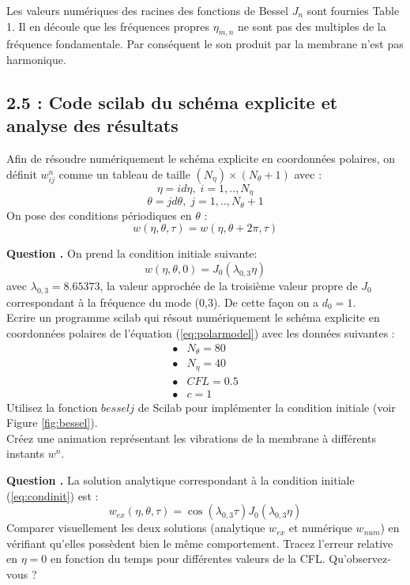 \documentclass[a4,12pt]{article}
\newcounter{Nbquestion}
\newcommand*\question{%
\stepcounter{Nbquestion}%
\textbf{Question \theNbquestion. }}
\begin{document}
    Les valeurs numériques des racines des fonctions de Bessel $J_n$ sont fournies Table 1. Il en découle que les fréquences propres $\eta_{m,n}$ ne sont pas des multiples de la fréquence fondamentale. Par conséquent le son produit par la membrane n'est pas harmonique.

    \newpage 

    \subsection*{2.5 : Code scilab du schéma explicite et analyse des résultats}

    Afin de résoudre numériquement le schéma explicite en coordonnées polaires, on définit $w_{ij}^n$ comme un tableau de taille $(N_\eta)\times(N_\theta+1)$ avec :
    \[
    \eta=id\eta ,\;i=1,..,N_\eta
    \]
    \[
    \theta=jd\theta ,\;j=1,..,N_\theta+1
    \]
    On pose des conditions périodiques en $\theta$ :
    \[
w(\eta,\theta,\tau)=w(\eta,\theta+2\pi,\tau)
    \]


    \question On prend la condition initiale suivante:
    \begin{equation}
w(\eta,\theta,0)=J_0(\lambda_{0,3}\eta)
    \label{eq:condinit}
    \end{equation}
    avec $\lambda_{0,3}=8.65373$, la valeur approchée de la troisième valeur propre de $J_0$ correspondant à la fréquence du mode (0,3). De cette façon on a $d_0=1$.\\

    Ecrire un programme scilab qui résout numériquement le schéma explicite en coordonnées polaires de l'équation (\ref{eq:polarmodel}) avec les données suivantes : 
    \[
    \begin{array}{ll}
    \bullet & N_\theta=80 \\ 
    \bullet & N_\eta=40 \\ 
    \bullet & CFL=0.5 \\ 
    \bullet & c=1
    \end{array}
    \]
    Utilisez la fonction $besselj$ de Scilab pour implémenter la condition initiale (voir Figure \ref{fig:bessel}).\\
        Créez une animation représentant les vibrations de la membrane à différents instants $w^n$.



        \question La solution analytique correspondant à la condition initiale (\ref{eq:condinit}) est :
    \[
w_{ex}(\eta,\theta,\tau)=\cos(\lambda_{0,3} \tau)J_0(\lambda_{0,3}\eta)
    \]
    Comparer visuellement les deux solutions (analytique $w_{ex}$ et numérique $w_{num}$) en vérifiant qu'elles possèdent bien le même comportement.
    Tracez l'erreur relative en $\eta=0$ en fonction du temps pour   différentes valeurs de la CFL. 
    Qu'observez-vous ?
\end{document}
